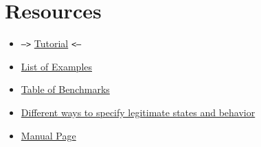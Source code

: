 
\section{Resources}
\begin{itemize}
\item  \texttt{-->} \href{tut.html}{Tutorial} \texttt{<--}
\item \href{examplelist.html}{List of Examples}
\item \href{benchmark.html}{Table of Benchmarks}
\item \href{legit.html}{Different ways to specify legitimate states and behavior}
\item \href{man.html}{Manual Page}
\end{itemize}





